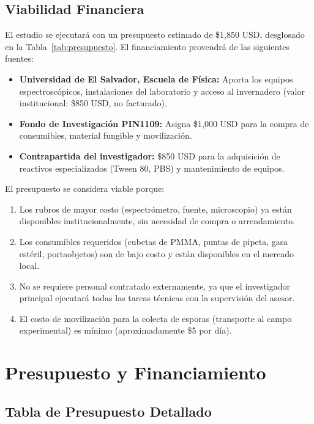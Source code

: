 \documentclass[12pt, a4paper]{article}
\begin{document}
	\subsection{Viabilidad Financiera}
	
	El estudio se ejecutará con un presupuesto estimado de \$1,850 USD, desglosado en la Tabla~\ref{tab:presupuesto}. El financiamiento provendrá de las siguientes fuentes:
	
	\begin{itemize}
		\item \textbf{Universidad de El Salvador, Escuela de Física:} Aporta los equipos espectroscópicos, instalaciones del laboratorio y acceso al invernadero (valor institucional: \$850 USD, no facturado).
		\item \textbf{Fondo de Investigación PIN1109:} Asigna \$1,000 USD para la compra de consumibles, material fungible y movilización.
		\item \textbf{Contrapartida del investigador:} \$850 USD para la adquisición de reactivos especializados (Tween 80, PBS) y mantenimiento de equipos.
	\end{itemize}
	
	El presupuesto se considera viable porque:
	\begin{enumerate}
		\item Los rubros de mayor costo (espectrómetro, fuente, microscopio) ya están disponibles institucionalmente, sin necesidad de compra o arrendamiento.
		\item Los consumibles requeridos (cubetas de PMMA, puntas de pipeta, gasa estéril, portaobjetos) son de bajo costo y están disponibles en el mercado local.
		\item No se requiere personal contratado externamente, ya que el investigador principal ejecutará todas las tareas técnicas con la supervisión del asesor.
		\item El costo de movilización para la colecta de esporas (transporte al campo experimental) es mínimo (aproximadamente \$5 por día).
	\end{enumerate}

	\section{Presupuesto y Financiamiento}
	
	\subsection{Tabla de Presupuesto Detallado}
	
\end{document}
